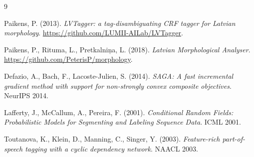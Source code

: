 \documentclass[11pt,a4paper]{article}
\begin{document}
\begin{thebibliography}{9}

Paikens, P. (2013).
\textit{LVTagger: a tag-disambiguating CRF tagger for Latvian morphology}.
\url{https://github.com/LUMII-AILab/LVTagger}.

Paikens, P., Rituma, L., Pretkalniņa, L. (2018).
\textit{Latvian Morphological Analyser}.
\url{https://github.com/PeterisP/morphology}.

Defazio, A., Bach, F., Lacoste-Julien, S. (2014).
\textit{SAGA: A fast incremental gradient method with support for non-strongly
convex composite objectives}.
NeurIPS 2014.

Lafferty, J., McCallum, A., Pereira, F. (2001).
\textit{Conditional Random Fields: Probabilistic Models for Segmenting and
Labeling Sequence Data}.
ICML 2001.

Toutanova, K., Klein, D., Manning, C., Singer, Y. (2003).
\textit{Feature-rich part-of-speech tagging with a cyclic dependency network}.
NAACL 2003.

\end{thebibliography}
\end{document}
